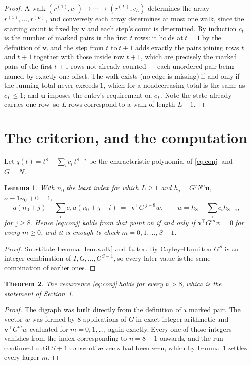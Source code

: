 \documentclass[11pt,a4paper]{article}
\theoremstyle{plain}
\newtheorem{theorem}{Theorem}
\newtheorem{lemma}[theorem]{Lemma}
\theoremstyle{definition}
\begin{document}
\begin{proof}
A walk $(r^{(1)},c_1)\to\cdots\to(r^{(L)},c_L)$ determines the array
$r^{(1)},\dots,r^{(L)}$, and conversely each array determines at most one walk, since the
starting count is fixed by $\mathbf{v}$ and each step's count is determined. By induction
$c_t$ is the number of marked pairs in the first $t$ rows: it holds at $t=1$ by the
definition of $\mathbf{v}$, and the step from $t$ to $t+1$ adds exactly the pairs joining
rows $t$ and $t+1$ together with those inside row $t+1$, which are precisely the marked
pairs of the first $t+1$ rows not already counted --- each unordered pair being named by
exactly one offset. The walk exists (no edge is missing) if and only if the running total
never exceeds $1$, which for a nondecreasing total is the same as $c_L\le1$; and
$\mathbf{u}$ imposes the entry's requirement on $c_L$. Note the state already carries one
row, so $L$ rows correspond to a walk of length $L-1$.
\end{proof}

\section{The criterion, and the computation}

Let $q(t)=t^{8}-\sum_i c_i\,t^{8-i}$ be the characteristic polynomial of
\eqref{eq:conj} and $G=N$.

\begin{lemma}\label{lem:crit}
With $n_0$ the least index for which $L\ge1$ and $h_j=G^{j}N^{o}\mathbf{u}$,
$o=1n_0+0-1$,
\[
a(n_0+j)-\sum_i c_i\,a(n_0+j-i)\;=\;\,\mathbf{v}^{\!\top}G^{\,j-8}w,
\qquad w=h_{8}-\sum_i c_i h_{8-i},
\]
for $j\ge8$. Hence \eqref{eq:conj} holds from that point on if and only if
$\mathbf{v}^{\!\top}G^{m}w=0$ for every $m\ge0$, and it is enough to check
$m=0,1,\dots,S-1$.
\end{lemma}

\begin{proof}
Substitute Lemma~\ref{lem:walk} and factor. By Cayley--Hamilton $G^{S}$ is an integer
combination of $I,G,\dots,G^{S-1}$, so every later value is the same combination of earlier
ones.
\end{proof}

\begin{theorem}
The recurrence \eqref{eq:conj} holds for every $n>8$, which is the statement of
Section~1.
\end{theorem}

\begin{proof}
The digraph was built directly from the definition of a marked pair. The vector $w$ was
formed by $8$ applications of $G$ in exact integer arithmetic and
$\mathbf{v}^{\!\top}G^{m}w$ evaluated for $m=0,1,\dots$, again exactly. Every one of
those integers vanishes from the index corresponding to $n=8+1$ onwards, and the run
continued until $S+1$ consecutive zeros had been seen, which by Lemma~\ref{lem:crit}
settles every larger $m$.
\end{proof}
\end{document}
